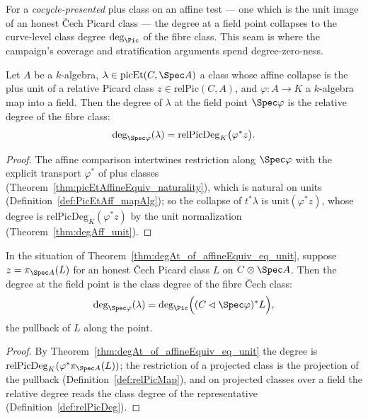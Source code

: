 For a \emph{cocycle-presented} plus class on an affine test — one which is the unit image of
an honest \v Cech Picard class — the degree at a field point collapses to the curve-level
class degree \(\deg_{\Pic}\) of the fibre class. This seam is where the campaign's coverage
and stratification arguments spend degree-zero-ness.

\begin{theorem}
  \label{thm:degAt_of_affineEquiv_eq_unit}
  \leanok
  Let \(A\) be a \(k\)-algebra, \(\lambda \in \mathrm{picEt}(C, \Spec A)\) a class whose
  affine collapse is the plus unit of a relative Picard class \(z \in \mathrm{relPic}(C,A)\),
  and \(\varphi \colon A \to K\) a \(k\)-algebra map into a field. Then the degree of
  \(\lambda\) at the field point \(\Spec \varphi\) is the relative degree of the fibre class:
  \[
    \deg_{\Spec\varphi}(\lambda) = \mathrm{relPicDeg}_K\bigl(\varphi^{*} z\bigr).
  \]
\end{theorem}
\begin{proof}
  \leanok
  The affine comparison intertwines restriction along \(\Spec\varphi\) with the explicit
  transport \(\varphi^{*}\) of plus classes (Theorem~\ref{thm:picEtAffineEquiv_naturality}),
  which is natural on units (Definition~\ref{def:PicEtAff_mapAlg}); so the collapse of
  \(t^{*}\lambda\) is \(\mathrm{unit}(\varphi^{*} z)\), whose degree is
  \(\mathrm{relPicDeg}_K(\varphi^{*} z)\) by the unit normalization
  (Theorem~\ref{thm:degAff_unit}).
\end{proof}

\begin{theorem}
  \label{thm:degAt_of_affineEquiv_eq_unit_relPicMk}
  \leanok
  In the situation of Theorem~\ref{thm:degAt_of_affineEquiv_eq_unit}, suppose
  \(z = \pi_{\Spec A}(L)\) for an honest \v Cech Picard class \(L\) on \(C \otimes \Spec A\).
  Then the degree at the field point is the class degree of the fibre \v Cech class:
  \[
    \deg_{\Spec\varphi}(\lambda)
      = \deg_{\Pic}\Bigl( (C \lhd \Spec\varphi)^{*} L \Bigr),
  \]
  the pullback of \(L\) along the point.
\end{theorem}
\begin{proof}
  \leanok
  By Theorem~\ref{thm:degAt_of_affineEquiv_eq_unit} the degree is
  \(\mathrm{relPicDeg}_K(\varphi^{*}\pi_{\Spec A}(L))\); the restriction of a projected class
  is the projection of the pullback (Definition~\ref{def:relPicMap}), and on projected
  classes over a field the relative degree reads the class degree of the representative
  (Definition~\ref{def:relPicDeg}).
\end{proof}

